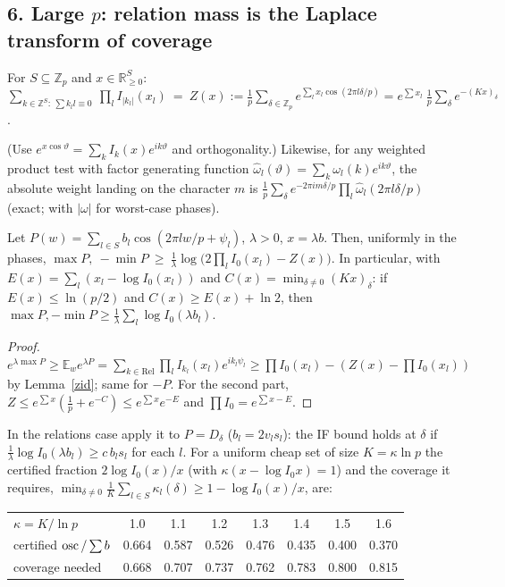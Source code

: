 \documentclass[11pt]{article}
\theoremstyle{remark}\newtheorem{remark}[theorem]{Remark}
\begin{document}
\subsection*{6. Large $p$: relation mass is the Laplace transform of coverage}
\begin{lemma}\label{zid}
For $S\subseteq\mathbb Z_p$ and $x\in\mathbb R_{\ge0}^S$:
$\displaystyle\sum_{k\in\mathbb Z^S:\ \sum k_ll\equiv0}\ \prod_lI_{|k_l|}(x_l)\ =\ Z(x):=\frac1p\sum_{\delta\in\mathbb Z_p}e^{\sum_lx_l\cos(2\pi l\delta/p)}
=e^{\sum x_l}\ \frac1p\sum_{\delta}e^{-(Kx)_\delta}$.
\end{lemma}
(Use $e^{x\cos\vartheta}=\sum_kI_k(x)e^{ik\vartheta}$ and orthogonality.)  Likewise, for any weighted product test with factor
generating function $\hat\omega_l(\vartheta)=\sum_k\omega_l(k)e^{ik\vartheta}$, the absolute weight landing on the character $m$ is
$\frac1p\sum_\delta e^{-2\pi im\delta/p}\prod_l\hat\omega_l(2\pi l\delta/p)$ (exact; with $|\omega|$ for worst-case phases).
\begin{proposition}\label{tilt}
Let $P(w)=\sum_{l\in S}b_l\cos(2\pi lw/p+\psi_l)$, $\lambda>0$, $x=\lambda b$.  Then, uniformly in the phases,
$\max P,\ -\min P\ \ge\ \frac1\lambda\log\big(2\prod_lI_0(x_l)-Z(x)\big)$.  In particular, with $E(x)=\sum_l(x_l-\log I_0(x_l))$ and
$C(x)=\min_{\delta\ne0}(Kx)_\delta$: if $E(x)\le\ln(p/2)$ and $C(x)\ge E(x)+\ln2$, then $\max P,-\min P\ge\frac1\lambda\sum_l\log I_0(\lambda b_l)$.
\end{proposition}
\begin{proof}
$e^{\lambda\max P}\ge\mathbb E_we^{\lambda P}=\sum_{k\in\mathrm{Rel}}\prod_lI_{k_l}(x_l)e^{ik_l\psi_l}\ge\prod I_0(x_l)-(Z(x)-\prod I_0(x_l))$ by Lemma~\ref{zid};
same for $-P$.  For the second part, $Z\le e^{\sum x}(\frac1p+e^{-C})\le e^{\sum x}e^{-E}$ and $\prod I_0=e^{\sum x-E}$.
\end{proof}
In the relations case apply it to $P=D_\delta$ ($b_l=2v_ls_l$): the IF bound holds at $\delta$ if $\frac1\lambda\log I_0(\lambda b_l)\ge c\,b_ls_l$ for each $l$.
For a uniform cheap set of size $K=\kappa\ln p$ the certified fraction $2\log I_0(x)/x$ (with $\kappa(x-\log I_0x)=1$) and the coverage it
requires, $\min_{\delta\ne0}\frac1K\sum_{l\in S}\kappa_l(\delta)\ge1-\log I_0(x)/x$, are:
\begin{center}\begin{tabular}{lccccccc}\toprule
$\kappa=K/\ln p$&1.0&1.1&1.2&1.3&1.4&1.5&1.6\\
certified $\operatorname{osc}/\sum b$&0.664&0.587&0.526&0.476&0.435&0.400&0.370\\
coverage needed&0.668&0.707&0.737&0.762&0.783&0.800&0.815\\\bottomrule\end{tabular}\end{center}
\end{document}
